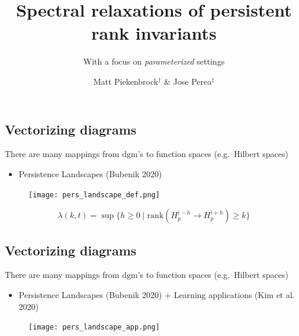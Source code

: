 \documentclass[
  letterpaper,
  DIV=11,
  numbers=noendperiod,
  oneside]{scrartcl}
\title{Spectral relaxations of persistent rank invariants}
\subtitle{With a focus on \emph{parameterized} settings}
\author{Matt Piekenbrock\(\mathrm{}^\dagger\) \& Jose
Perea\(\mathrm{}^\ddagger\)}
\date{}
\providecommand{\tightlist}{%
  \setlength{\itemsep}{0pt}\setlength{\parskip}{0pt}}\usepackage{longtable,booktabs,array}
\begin{document}
\maketitle
\ifdefined\Shaded\renewenvironment{Shaded}{\begin{tcolorbox}[sharp corners, breakable, interior hidden, boxrule=0pt, enhanced, borderline west={3pt}{0pt}{shadecolor}, frame hidden]}{\end{tcolorbox}}\fi

\hypertarget{vectorizing-diagrams}{%
\subsection{Vectorizing diagrams}\label{vectorizing-diagrams}}

There are many mappings from \(\mathrm{dgm}\)'s to function spaces
(e.g.~Hilbert spaces)

\begin{itemize}
\tightlist
\item
  Persistence Landscapes (Bubenik 2020)
\end{itemize}

\begin{figure}

{\centering \texttt{[image: pers\_landscape\_def.png]}

}

\end{figure}

\[ \lambda(k, t) = \sup \{ h \geq 0 \mid \mathrm{rank}(H_p^{i-h} \to H_p^{i+h}) \geq k \} \]

\hypertarget{vectorizing-diagrams-1}{%
\subsection{Vectorizing diagrams}\label{vectorizing-diagrams-1}}

There are many mappings from \(\mathrm{dgm}\)'s to function spaces
(e.g.~Hilbert spaces)

\begin{itemize}
\tightlist
\item
  Persistence Landscapes (Bubenik 2020) + Learning applications (Kim et
  al. 2020)
\end{itemize}

\begin{figure}

{\centering \texttt{[image: pers\_landscape\_app.png]}

}

\end{figure}
\end{document}
